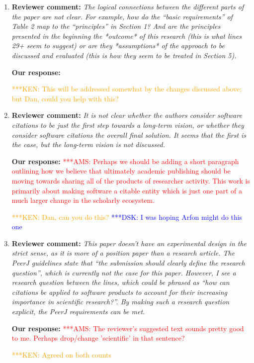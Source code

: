 \documentclass{article}
\newcommand{\katznote}[1]{ {\textcolor{blue} { ***DSK: #1 }}} %
\newcommand{\niemnote}[1]{ {\textcolor{orange} { ***KEN: #1 }}} %
\newcommand{\asnote}[1]{ {\textcolor{red} { ***AMS: #1 }}} %
\begin{document}
\begin{enumerate}
\item \textbf{Reviewer comment:}
\emph{The logical connections between the different parts of the paper are not clear. For example, how do the ``basic requirements'' of Table 2 map to the ``principles'' in Section 1? And are the principles presented in the beginning the *outcome* of this research (this is what lines 29+ seem to suggest) or are they *assumptions* of the approach to be discussed and evaluated (this is how they seem to be treated in Section 5).}

\textbf{Our response:}

\niemnote{This will be addressed somewhat by the changes discussed above; but Dan, could you help with this?}


\item \textbf{Reviewer comment:}
\emph{It is not clear whether the authors consider software citations to be just the first step towards a long-term vision, or whether they consider software citations the overall final solution. It seems that the first is the case, but the long-term vision is not discussed.}

\textbf{Our response:}
\asnote{Perhaps we should be adding a short paragraph outlining how we believe that ultimately academic publishing should be moving towards sharing all of the products of researcher activity. This work is primarily about making software a citable entity which is just one part of a much larger change in the scholarly ecosystem.}

\niemnote{Dan, can you do this?} \katznote{I was hoping Arfon might do this one}

\item \textbf{Reviewer comment:}
\emph{This paper doesn't have an experimental design in the strict sense, as it is more of a position paper than a research article. The PeerJ guidelines state that ``the submission should clearly define the research question'', which is currently not the case for this paper. However, I see a research question between the lines, which could be phrased as ``how can citations be applied to software products to account for their increasing importance in scientific research?''. By making such a research question explicit, the PeerJ requirements can be met.}

\textbf{Our response:}
\asnote{The reviewer's suggested text sounds pretty good to me. Perhaps drop/change 'scientific' in that sentence?}

\niemnote{Agreed on both counts}


\end{enumerate}
\end{document}
